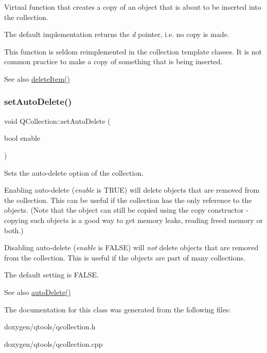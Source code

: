 Virtual function that creates a copy of an object that is about to be inserted into the collection.

The default implementation returns the {\itshape d} pointer, i.\+e. no copy is made.

This function is seldom reimplemented in the collection template classes. It is not common practice to make a copy of something that is being inserted.

\begin{DoxySeeAlso}{See also}
\mbox{\hyperlink{class_q_collection_ab6c7cf56b681ba4fed6cf6a92494a410}{delete\+Item()}} 
\end{DoxySeeAlso}
\mbox{\label{class_q_collection_a6ed41913c76bfba54be6da26015ee3f3}} 
\subsubsection{\texorpdfstring{setAutoDelete()}{setAutoDelete()}}
{\footnotesize\ttfamily void Q\+Collection\+::set\+Auto\+Delete (\begin{DoxyParamCaption}\item[{bool}]{enable }\end{DoxyParamCaption})\hspace{0.3cm}{\ttfamily [inline]}}

Sets the auto-\/delete option of the collection.

Enabling auto-\/delete ({\itshape enable} is T\+R\+UE) will delete objects that are removed from the collection. This can be useful if the collection has the only reference to the objects. (Note that the object can still be copied using the copy constructor -\/ copying such objects is a good way to get memory leaks, reading freed memory or both.)

Disabling auto-\/delete ({\itshape enable} is F\+A\+L\+SE) will {\itshape not} delete objects that are removed from the collection. This is useful if the objects are part of many collections.

The default setting is F\+A\+L\+SE.

\begin{DoxySeeAlso}{See also}
\mbox{\hyperlink{class_q_collection_a18a880ce3024c10ccf53509ba27170ac}{auto\+Delete()}} 
\end{DoxySeeAlso}


The documentation for this class was generated from the following files\+:\begin{DoxyCompactItemize}
\item 
doxygen/qtools/qcollection.\+h\item 
doxygen/qtools/qcollection.\+cpp\end{DoxyCompactItemize}
